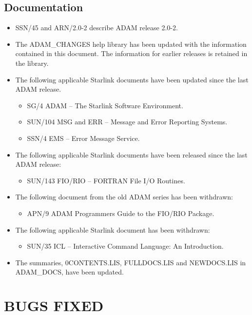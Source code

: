 \subsection{Documentation}
\label{docs}
\begin{itemize}
\item SSN/45 and ARN/2.0-2 describe ADAM release 2.0-2.
\item The ADAM\_CHANGES help library has been updated 
with the information contained in this document. The information for earlier
releases is
retained in the library.
\item The following applicable Starlink documents have been updated since the
last ADAM release.
\begin{itemize}
\item SG/4 ADAM -- The Starlink Software Environment.
\item SUN/104 MSG and ERR -- Message and Error Reporting Systems.
\item SSN/4 EMS -- Error Message Service.
\end{itemize}
\item The following applicable Starlink documents have been released since the
last ADAM release:
\begin{itemize}
\item SUN/143 FIO/RIO -- FORTRAN File I/O Routines.
\end{itemize}
\item The following document from the old ADAM series has been withdrawn:
\begin{itemize}
\item APN/9 ADAM Programmers Guide to the FIO/RIO Package.
\end{itemize}
\item The following applicable Starlink document has been withdrawn:
\begin{itemize}
\item SUN/35 ICL -- Interactive Command Language: An Introduction.
\end{itemize}
\item The summaries, 0CONTENTS.LIS, FULLDOCS.LIS and NEWDOCS.LIS in
ADAM\-\_DOCS, have been updated. 
\end{itemize}

\section{BUGS FIXED}

